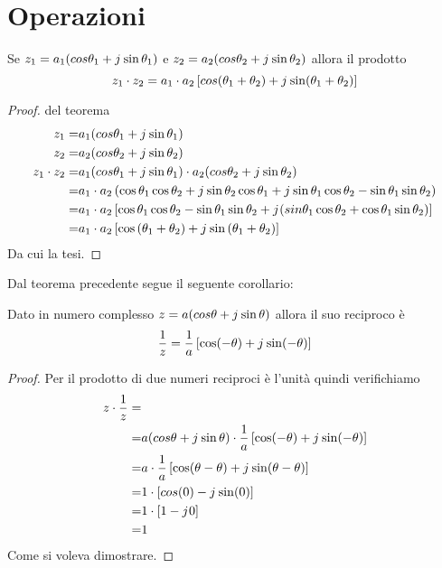 \section{Operazioni}
\begin{thm}[Prodotto]\label{thm:Compl_Prodotto}
Se $z_1=a_1(cos\theta_1+j\mkern1mu\sin\theta_1)$ e $z_2=a_2(cos\theta_2+j\mkern1mu\sin\theta_2)$ allora il prodotto \[z_1\cdot z_2=a_1\cdot a_2\left[cos(\theta_1+\theta_2)+j\mkern1mu\sin(\theta_1+\theta_2)\right] \] 
\end{thm}
\begin{proof} del teorema
	\begin{align*}
	z_1=&a_1(cos\theta_1+j\mkern1mu\sin\theta_1)\\
	z_2=&a_2(cos\theta_2+j\mkern1mu\sin\theta_2)\\
	z_1\cdot z_2=&a_1(cos\theta_1+j\mkern1mu\sin\theta_1)\cdot a_2(cos\theta_2+j\mkern1mu\sin\theta_2)\\
	=&a_1\cdot a_2\left(\cos\theta_1\cos\theta_2+j\mkern1mu\sin\theta_2\cos\theta_1+j\mkern1mu\sin\theta_1\cos\theta_2-\sin\theta_1\sin\theta_2\right)\\
	=&a_1\cdot a_2\left[\cos\theta_1\cos\theta_2-\sin\theta_1\sin\theta_2+j\mkern1mu(sin\theta_1\cos\theta_2+\cos\theta_1\sin\theta_2)\right]\\
	=&a_1\cdot a_2\left[\cos\left(\theta_1+\theta_2\right)+j\mkern1mu\sin\left(\theta_1+\theta_2\right)\right]
	\end{align*}
	Da cui la tesi.
\end{proof}
Dal teorema precedente segue il seguente corollario:
\begin{cor}[Reciproco]\label{cor:Complex:reciproco}
	Dato in numero complesso $z=a(cos\theta+j\mkern1mu\sin\theta)$ allora il suo reciproco è \begin{equation*}
	\dfrac{1}{z}=\dfrac{1}{a}\left[\cos (-\theta)+j\mkern1mu\sin(-\theta)\right]
	\end{equation*}\label{equa:Compl_reciproco}
\end{cor}
\begin{proof}
	Per il prodotto di due numeri reciproci è l'unità quindi verifichiamo 
\begin{align*}
z\cdot\dfrac{1}{z}=&\\
=&a(cos\theta+j\mkern1mu\sin\theta)\cdot\dfrac{1}{a}\left[\cos (-\theta)+j\mkern1mu\sin(-\theta)\right]\\
=&a\cdot\dfrac{1}{a}\left[\cos(\theta-\theta)+j\mkern1mu\sin(\theta-\theta)\right]\\
=&1\cdot\left[cos(0)-j\mkern1mu\sin(0)\right]\\
=&1\cdot\left[1-j\mkern1mu 0\right]\\
=&1
\end{align*}
Come si voleva dimostrare.
\end{proof}
